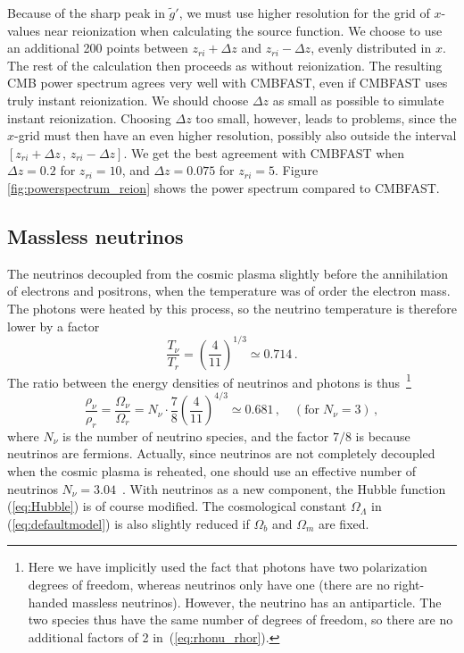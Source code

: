\documentclass[twocolumn,nofootinbib,amsmath,amssymb]{revtex4}
\newcommand{\be}{\begin{equation}}
\newcommand{\ee}{\end{equation}}
\begin{document}
Because of the sharp peak in $\tilde{g}'$, we must use higher resolution for
the grid of $x$-values near reionization when calculating the source function.
We choose to use an additional 200 points between $z_{ri} + \Delta z$ and
$z_{ri} - \Delta z$, evenly distributed in $x$. The rest of the calculation
then proceeds as without reionization. The resulting CMB power spectrum agrees
very well with CMBFAST, even if CMBFAST uses truly instant reionization. We
should choose $\Delta z$ as small as possible to simulate instant reionization.
Choosing $\Delta z$ too small, however, leads to problems, since the $x$-grid
must then have an even higher resolution, possibly also outside the interval
$\left[ z_{ri} + \Delta z \, , \, z_{ri} - \Delta z \right]$. We get the best
agreement with CMBFAST when $\Delta z = 0.2$ for $z_{ri} = 10$, and $\Delta z =
0.075$ for $z_{ri} = 5$. Figure \ref{fig:powerspectrum_reion} shows the power
spectrum compared to CMBFAST.


\subsection{Massless neutrinos}
\label{cha:neutrinos}

The neutrinos decoupled from the cosmic plasma slightly before the annihilation
of electrons and positrons, when the temperature was of order the electron
mass. The photons were heated by this process, so the neutrino temperature is
therefore lower by a factor~\cite{Dodelson}
\be
  \frac{T_\nu}{T_r} = \left( \frac{4}{11} \right)^{1/3} \simeq 0.714 \, .
\ee
The ratio between the energy densities of neutrinos and photons is
thus~\footnote{Here we have implicitly used the fact that photons have two
polarization degrees of freedom, whereas neutrinos only have one (there are no
right-handed massless neutrinos). However, the neutrino has an antiparticle.
The two species thus have the same number of degrees of freedom, so there are
no additional factors of 2 in~(\ref{eq:rhonu_rhor}).}
\be
  \frac{\rho_\nu}{\rho_r} = \frac{\Omega_\nu}{\Omega_r} =
    N_\nu \cdot \frac{7}{8} \!\left( \!\frac{4}{11}\! \right)^{\!4/3}
    \!\!\! \simeq 0.681 \, ,
    \quad (\mathrm{for}\; N_\nu = 3) \, ,
  \label{eq:rhonu_rhor}
\ee
where $N_\nu$ is the number of neutrino species, and the factor $7/8$ is
because neutrinos are fermions. Actually, since neutrinos are not completely
decoupled when the cosmic plasma is reheated, one should use an effective
number of neutrinos $N_\nu = 3.04$~\cite{Lopez}. With neutrinos as a new
component, the Hubble function (\ref{eq:Hubble}) is of course modified. The
cosmological constant $\Omega_\Lambda$ in (\ref{eq:defaultmodel}) is also
slightly reduced if $\Omega_b$ and $\Omega_m$ are fixed.
\end{document}
